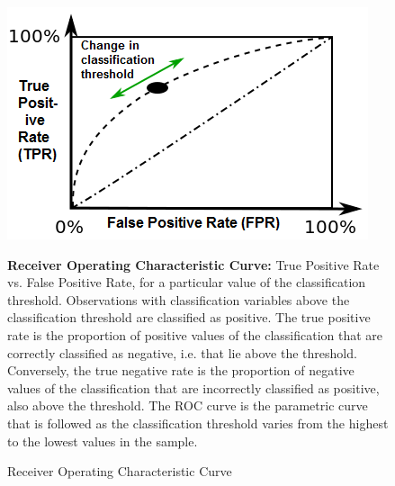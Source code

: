 


\begin{figure}[h!]

\begin{center}

    \caption{Receiver Operating Characteristic Curve} \label{fig:ROCcurve1}

        \includegraphics[scale=  0.75]{Figs/ROC/ROC_curve_3.png}



\end{center}

    \footnotesize

        \textbf{Receiver Operating Characteristic Curve:}
        True Positive Rate vs. False Positive Rate, for a particular value of the classification threshold. 
        Observations with classification variables above the classification threshold are classified as positive. 
        The true positive rate is the proportion of positive values of the classification that are correctly classified as negative, i.e. that lie above the threshold. 
        Conversely, the true negative rate is the proportion of negative values of the classification that are incorrectly classified as positive, also above the threshold. 
        The ROC curve is the parametric curve that is followed as the classification threshold varies from the highest to the lowest values in the sample. 


\end{figure}



